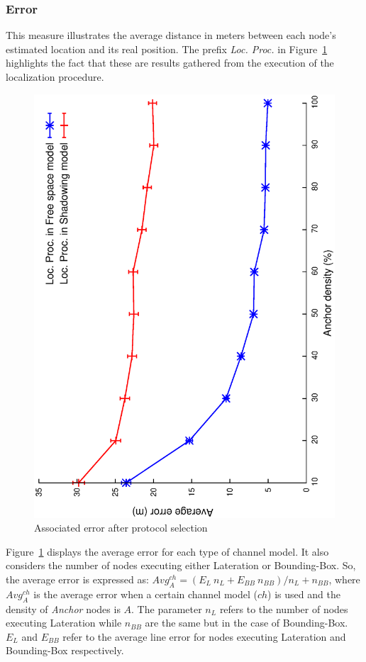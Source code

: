\subsubsection{Error}
This measure illustrates the average distance in meters between each node's estimated location and its real position. The prefix \emph{Loc. Proc.} in Figure~\ref{pme:error} highlights the fact that these are results gathered from the execution of the localization procedure.

\begin{figure}[tb]
  \centering
  \includegraphics[width=0.7\linewidth, angle = -90]{section4/figures/pmeAverageErrorPerProtocol.eps}
  \caption{Associated error after protocol selection
  \label{pme:error}}
\end{figure}

Figure~\ref{pme:error} displays the average error for each type of channel model. It also considers the number of nodes executing either Lateration or Bounding-Box. So, the average error is expressed as: $Avg_{A}^{ch} = (E_{L}~n_{L} + E_{BB}~n_{BB}) /n_{L}+n_{BB}$, where $Avg_{A}^{ch}$ is the average error when a certain channel model ($ch$) is used and the density of \emph{Anchor} nodes is $A$. The parameter $n_{L}$ refers to the number of nodes executing Lateration while $n_{BB}$ are the same but in the case of Bounding-Box. $E_{L}$ and $E_{BB}$ refer to the average line error for nodes executing Lateration and Bounding-Box respectively.

